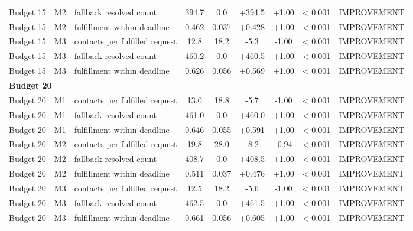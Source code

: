 \begin{table}[t]
\begin{tabular}{lllcccccl}
Budget 15 & M2 & fallback resolved count & 394.7 & 0.0 & +394.5 & +1.00 & < 0.001 & IMPROVEMENT \\
Budget 15 & M2 & fulfillment within deadline & 0.462 & 0.037 & +0.428 & +1.00 & < 0.001 & IMPROVEMENT \\
Budget 15 & M3 & contacts per fulfilled request & 12.8 & 18.2 & -5.3 & -1.00 & < 0.001 & IMPROVEMENT \\
Budget 15 & M3 & fallback resolved count & 460.2 & 0.0 & +460.5 & +1.00 & < 0.001 & IMPROVEMENT \\
Budget 15 & M3 & fulfillment within deadline & 0.626 & 0.056 & +0.569 & +1.00 & < 0.001 & IMPROVEMENT \\
\midrule
\multicolumn{9}{l}{\textbf{Budget 20}} \\
\midrule
Budget 20 & M1 & contacts per fulfilled request & 13.0 & 18.8 & -5.7 & -1.00 & < 0.001 & IMPROVEMENT \\
Budget 20 & M1 & fallback resolved count & 461.0 & 0.0 & +460.0 & +1.00 & < 0.001 & IMPROVEMENT \\
Budget 20 & M1 & fulfillment within deadline & 0.646 & 0.055 & +0.591 & +1.00 & < 0.001 & IMPROVEMENT \\
Budget 20 & M2 & contacts per fulfilled request & 19.8 & 28.0 & -8.2 & -0.94 & < 0.001 & IMPROVEMENT \\
Budget 20 & M2 & fallback resolved count & 408.7 & 0.0 & +408.5 & +1.00 & < 0.001 & IMPROVEMENT \\
Budget 20 & M2 & fulfillment within deadline & 0.511 & 0.037 & +0.476 & +1.00 & < 0.001 & IMPROVEMENT \\
Budget 20 & M3 & contacts per fulfilled request & 12.5 & 18.2 & -5.6 & -1.00 & < 0.001 & IMPROVEMENT \\
Budget 20 & M3 & fallback resolved count & 462.5 & 0.0 & +461.5 & +1.00 & < 0.001 & IMPROVEMENT \\
Budget 20 & M3 & fulfillment within deadline & 0.661 & 0.056 & +0.605 & +1.00 & < 0.001 & IMPROVEMENT \\
\bottomrule
\end{tabular}
\end{table}
